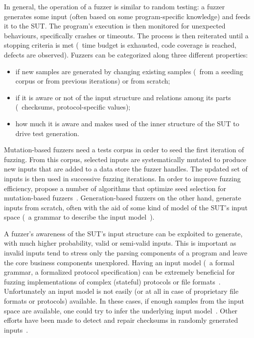 In general, the operation of a fuzzer is similar to random testing: a fuzzer
generates some input (often based on some program-specific knowledge) and feeds
it to the \ac{SUT}. The program's execution is then monitored for unexpected
behaviours, specifically crashes or timeouts. The process is then reiterated
until a stopping criteria is met (\eg~time budget is exhausted, code coverage
is reached, defects are observed). Fuzzers can be categorized along three
different properties:

\begin{itemize}
    \item if new samples are generated by changing existing samples (\eg~from
        a seeding corpus or from previous iterations) or from scratch;
    \item if it is aware or not of the input structure and relations among its
        parts (\eg~checksums, protocol-specific values);
    \item how much it is aware and makes used of the inner structure of the
        \ac{SUT} to drive test generation.
\end{itemize}

Mutation-based fuzzers need a tests corpus in order to seed the first iteration
of fuzzing. From this corpus, selected inputs are systematically mutated to
produce new inputs that are added to a data store the fuzzer handles. The
updated set of inputs is then used in successive fuzzing iterations. In order to
improve fuzzing efficiency, \citeauthor{rebert2014optimizing} propose a number
of algorithms that optimize seed selection for mutation-based
fuzzers~\cite{rebert2014optimizing}. Generation-based fuzzers on the other hand,
generate inputs from scratch, often with the aid of some kind of model of the
\ac{SUT}'s input space (\eg~a grammar to describe the input
model~\cite{godefroid2008grammar}).

A fuzzer's awareness of the \ac{SUT}'s input structure can be exploited to
generate, with much higher probability, valid or semi-valid inputs. This is
important as invalid inputs tend to stress only the parsing components of a
program and leave the core business components unexplored. Having an input model
(\eg~a formal grammar, a formalized protocol specification) can be extremely
beneficial for fuzzing implementations of complex (stateful) protocols or file
formats~\cite{banks2006snooze, pham2016model}. Unfortunately an input model is
not easily (or at all in case of proprietary file formats or protocols)
available. In these cases, if enough samples from the input space are available,
one could try to infer the underlying input
model~\cite{bastani2017synthesizing}. Other efforts have been made to detect
and repair checksums in randomly generated inputs~\cite{wang2010taintscope}.

